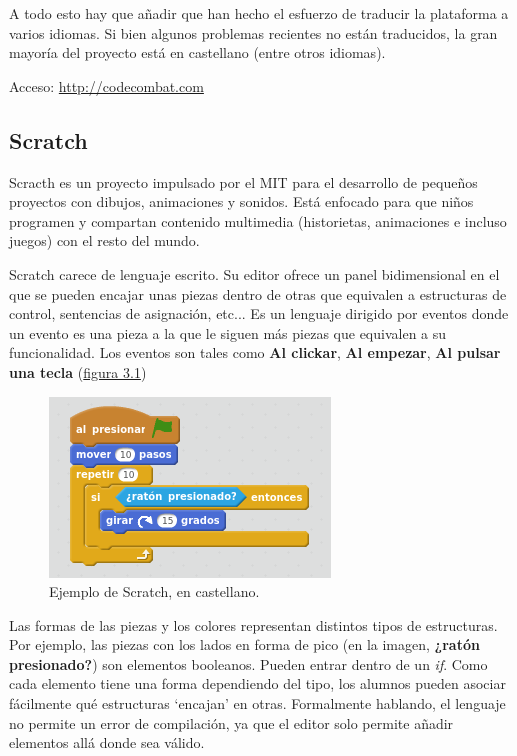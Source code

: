 \documentclass{report}
\begin{document}
	\vspace{10px}
	
	A todo esto hay que añadir que han hecho el esfuerzo de traducir la plataforma a varios idiomas. Si bien algunos problemas recientes no están traducidos, la gran mayoría del proyecto está en castellano (entre otros idiomas).
	
	\vspace{10px}
	
	Acceso: \url{http://codecombat.com}
	
	\subsection{Scratch}
	
	Scracth es un proyecto impulsado por el MIT para el desarrollo de pequeños proyectos con dibujos, animaciones y sonidos. Está enfocado para que niños programen y compartan contenido multimedia (historietas, animaciones e incluso juegos) con el resto del mundo. 
	
	Scratch carece de lenguaje escrito. Su editor ofrece un panel bidimensional en el que se pueden encajar unas piezas dentro de otras que equivalen a estructuras de control, sentencias de asignación, etc... Es un lenguaje dirigido por eventos donde un evento es una pieza a la que le siguen más piezas que equivalen a su funcionalidad. Los eventos son tales como \textbf{Al clickar}, \textbf{Al empezar}, \textbf{Al pulsar una tecla} (\hyperref[fig:scratch]{figura 3.1})
	
	
\begin{figure}
\centering
\includegraphics[width=0.7\linewidth]{scratch}
\caption[Ejemplo de Scratch.]{Ejemplo de Scratch, en castellano.}
\label{fig:scratch}
\end{figure}


	Las formas de las piezas y los colores representan distintos tipos de estructuras. Por ejemplo, las piezas con los lados en forma de pico (en la imagen, \textbf{¿ratón presionado?}) son elementos booleanos. Pueden entrar dentro de un \textit{if}. Como cada elemento tiene una forma dependiendo del tipo, los alumnos pueden asociar fácilmente qué estructuras `encajan' en otras. Formalmente hablando, el lenguaje no permite un error de compilación, ya que el editor solo permite añadir elementos allá donde sea válido.
\end{document}
